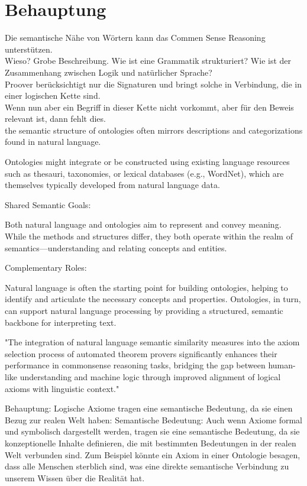 \documentclass[german,version-2020-11]{uzl-thesis}
\begin{document}
\chapter{Behauptung}
Die semantische Nähe von Wörtern kann das Commen Sense Reasoning unterstützen.\\
Wieso? Grobe Beschreibung. Wie ist eine Grammatik strukturiert? Wie ist der Zusammenhang zwischen Logik und natürlicher Sprache? \\
Proover berücksichtigt nur die Signaturen und bringt solche in Verbindung, die in einer logischen Kette sind. \\
Wenn nun aber ein Begriff in dieser Kette nicht vorkommt, aber für den Beweis relevant ist, dann fehlt dies. \\

the semantic structure of ontologies often mirrors descriptions and categorizations found in natural language.

Ontologies might integrate or be constructed using existing language resources such as thesauri, taxonomies, or lexical databases (e.g., WordNet), which are themselves typically developed from natural language data.

Shared Semantic Goals:

Both natural language and ontologies aim to represent and convey meaning. While the methods and structures differ, they both operate within the realm of semantics—understanding and relating concepts and entities.

Complementary Roles:

Natural language is often the starting point for building ontologies, helping to identify and articulate the necessary concepts and properties. Ontologies, in turn, can support natural language processing by providing a structured, semantic backbone for interpreting text.

"The integration of natural language semantic similarity measures into the axiom selection process of automated theorem provers significantly enhances their performance in commonsense reasoning tasks, bridging the gap between human-like understanding and machine logic through improved alignment of logical axioms with linguistic context."

Behauptung: Logische Axiome tragen eine semantische Bedeutung, da sie einen Bezug zur realen Welt haben: Semantische Bedeutung: Auch wenn Axiome formal und symbolisch dargestellt werden, tragen sie eine semantische Bedeutung, da sie konzeptionelle Inhalte definieren, die mit bestimmten Bedeutungen in der realen Welt verbunden sind. Zum Beispiel könnte ein Axiom in einer Ontologie besagen, dass alle Menschen sterblich sind, was eine direkte semantische Verbindung zu unserem Wissen über die Realität hat.
\end{document}
